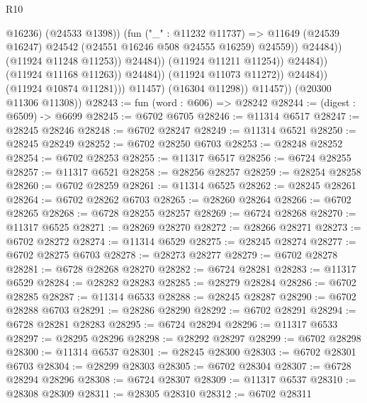 \begin{lexlean}{R10}
\begin{coremodule}
                                                    @16236)
                                                  (@24533 @1398))
                                                (fun ("_" : @11232 @11737) =>
                                                @11649
                                                  (@24539 @16247)
                                                  @24542
                                                  (@24551 @16246 @508 @24555 @16259)
                                                  @24559))
                                              @24484))
                                          (@11924 @11248 @11253))
                                        @24484))
                                    (@11924 @11211 @11254))
                                  @24484))
                              (@11924 @11168 @11263))
                            @24484))
                        (@11924 @11073 @11272))
                      @24484))
                  (@11924 @10874 @11281)))
              @11457)
            (@16304 @11298))
          @11457))
      (@20300 @11306 @11308))
@28243 := fun (word : @606) => @28242
@28244 := (digest : @6509) -> @6699
@28245 := @6702 @6705
@28246 := @11314 @6517
@28247 := @28245 @28246
@28248 := @6702 @28247
@28249 := @11314 @6521
@28250 := @28245 @28249
@28252 := @6702 @28250 @6703
@28253 := @28248 @28252
@28254 := @6702 @28253
@28255 := @11317 @6517
@28256 := @6724 @28255
@28257 := @11317 @6521
@28258 := @28256 @28257
@28259 := @28254 @28258
@28260 := @6702 @28259
@28261 := @11314 @6525
@28262 := @28245 @28261
@28264 := @6702 @28262 @6703
@28265 := @28260 @28264
@28266 := @6702 @28265
@28268 := @6728 @28255 @28257
@28269 := @6724 @28268
@28270 := @11317 @6525
@28271 := @28269 @28270
@28272 := @28266 @28271
@28273 := @6702 @28272
@28274 := @11314 @6529
@28275 := @28245 @28274
@28277 := @6702 @28275 @6703
@28278 := @28273 @28277
@28279 := @6702 @28278
@28281 := @6728 @28268 @28270
@28282 := @6724 @28281
@28283 := @11317 @6529
@28284 := @28282 @28283
@28285 := @28279 @28284
@28286 := @6702 @28285
@28287 := @11314 @6533
@28288 := @28245 @28287
@28290 := @6702 @28288 @6703
@28291 := @28286 @28290
@28292 := @6702 @28291
@28294 := @6728 @28281 @28283
@28295 := @6724 @28294
@28296 := @11317 @6533
@28297 := @28295 @28296
@28298 := @28292 @28297
@28299 := @6702 @28298
@28300 := @11314 @6537
@28301 := @28245 @28300
@28303 := @6702 @28301 @6703
@28304 := @28299 @28303
@28305 := @6702 @28304
@28307 := @6728 @28294 @28296
@28308 := @6724 @28307
@28309 := @11317 @6537
@28310 := @28308 @28309
@28311 := @28305 @28310
@28312 := @6702 @28311

\end{coremodule}
\end{lexlean}
